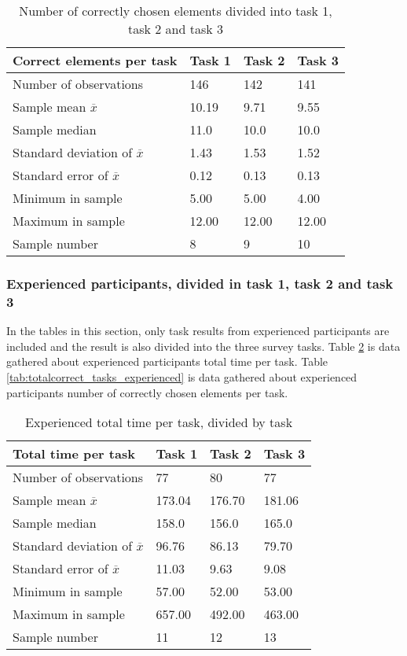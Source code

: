 \begin{table}[H]
	\centering
	\begin{tabular}{l|l|l|l}
		Correct elements per task & Task 1 & Task 2 & Task 3\\ \hline
		Number of observations & 146    & 142     & 141        \\
		Sample mean $\overline{x}$ & 10.19  &  9.71  &   9.55   \\
		Sample median & 11.0 &  10.0  &  10.0   \\
		Standard deviation of $\overline{x}$ & 1.43  & 1.53 & 1.52    \\
		Standard error of $\overline{x}$ & 0.12 &  0.13 & 0.13  \\
		Minimum in sample  & 5.00  & 5.00  &   4.00  \\
		Maximum in sample  & 12.00 & 12.00  & 12.00 \\ \hline
		Sample number & 8  & 9  & 10   \\ \hline
	\end{tabular}
	\caption[Correct elements, divided into task 1, task 2 and task 3]{Number of correctly chosen elements divided into task 1, task 2 and task 3}
	\label{tab:totalcorrect_tasks}
\end{table}

\subsubsection{Experienced participants, divided in task 1, task 2 and task 3}\label{sec:taskdivided_experienced}

In the tables in this section, only task results from experienced participants are included and the result is also divided into the three survey tasks. Table \ref{tab:totaltime_tasks_experienced} is data gathered about experienced participants total time per task. Table \ref{tab:totalcorrect_tasks_experienced} is data gathered about experienced participants number of correctly chosen elements per task.

\begin{table}[H]
	\centering
	\begin{tabular}{l|l|l|l}
		Total time per task & Task 1 & Task 2 & Task 3 \\ \hline
		Number of observations & 77  & 80   & 77  \\
		Sample mean $\overline{x}$  & 173.04  &  176.70  &  181.06   \\
		Sample median  & 158.0  &  156.0  &  165.0  \\
		Standard deviation of $\overline{x}$ & 96.76  & 86.13  & 79.70   \\
		Standard error of $\overline{x}$ & 11.03 & 9.63 & 9.08  \\
		Minimum in sample   & 57.00  & 52.00 &  53.00  \\
		Maximum in sample  & 657.00 & 492.00  & 463.00 \\ \hline
		Sample number & 11  & 12  & 13   \\ \hline
	\end{tabular}
	\caption[Total time, task and experienved divided]{Experienced total time per task, divided by task}
	\label{tab:totaltime_tasks_experienced}
\end{table}

